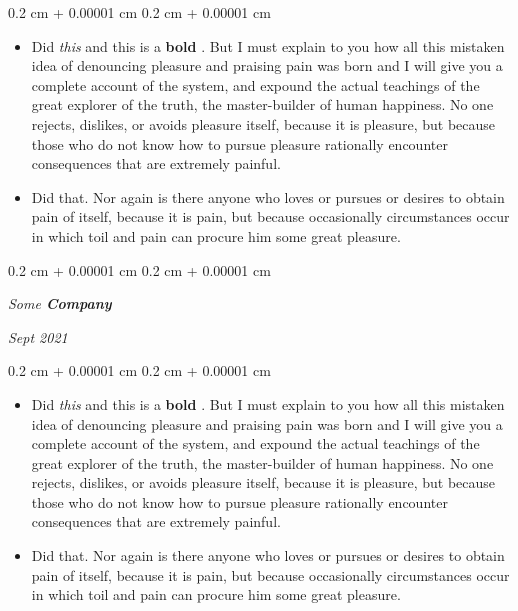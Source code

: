\documentclass[10pt, letterpaper]{article}
\newenvironment{highlights}{
    \begin{itemize}[
        topsep=0.10 cm,
        parsep=0.10 cm,
        partopsep=0pt,
        itemsep=0pt,
        leftmargin=0.4 cm + 10pt
    ]
}{
    \end{itemize}
} %
\newenvironment{onecolentry}{
    \begin{adjustwidth}{
        0.2 cm + 0.00001 cm
    }{
        0.2 cm + 0.00001 cm
    }
}{
    \end{adjustwidth}
} %
\newenvironment{twocolentry}[2][]{
    \onecolentry
    \def\secondColumn{#2}
    \setcolumnwidth{\fill, 4.5 cm}
    \begin{paracol}{2}
}{
    \switchcolumn \raggedleft \secondColumn
    \end{paracol}
    \endonecolentry
} %
\let\hrefWithoutArrow\href
\renewcommand{\href}[2]{\hrefWithoutArrow{#1}{\ifthenelse{\equal{#2}{}}{ }{#2 }\raisebox{.15ex}{\footnotesize \faExternalLink*}}}
\begin{document}
        \vspace{0.10 cm}
        \begin{onecolentry}
            \begin{highlights}
                \item Did \textit{this} and this is a \textbf{bold} \href{https://example.com}{link}. But I must explain to you how all this mistaken idea of denouncing pleasure and praising pain was born and I will give you a complete account of the system, and expound the actual teachings of the great explorer of the truth, the master-builder of human happiness. No one rejects, dislikes, or avoids pleasure itself, because it is pleasure, but because those who do not know how to pursue pleasure rationally encounter consequences that are extremely painful.
                \item Did that. Nor again is there anyone who loves or pursues or desires to obtain pain of itself, because it is pain, but because occasionally circumstances occur in which toil and pain can procure him some great pleasure.
            \end{highlights}
        \end{onecolentry}


        \vspace{0.2 cm}

            \begin{twocolentry}{


        \textit{Sept 2021}    }
                \textbf{}

                \textit{Some \textbf{Company}}
            \end{twocolentry}

        \vspace{0.10 cm}
        \begin{onecolentry}
            \begin{highlights}
                \item Did \textit{this} and this is a \textbf{bold} \href{https://example.com}{link}. But I must explain to you how all this mistaken idea of denouncing pleasure and praising pain was born and I will give you a complete account of the system, and expound the actual teachings of the great explorer of the truth, the master-builder of human happiness. No one rejects, dislikes, or avoids pleasure itself, because it is pleasure, but because those who do not know how to pursue pleasure rationally encounter consequences that are extremely painful.
                \item Did that. Nor again is there anyone who loves or pursues or desires to obtain pain of itself, because it is pain, but because occasionally circumstances occur in which toil and pain can procure him some great pleasure.
            \end{highlights}
        \end{onecolentry}
\end{document}

